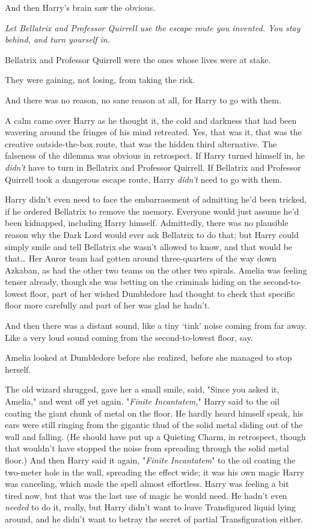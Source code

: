 And then Harry's brain saw the obvious.

\emph{Let Bellatrix and Professor Quirrell use the escape route you invented. 
You stay behind, and turn yourself in.}

Bellatrix and Professor Quirrell were the ones whose lives were at stake.

They were gaining, not losing, from taking the risk.

And there was no reason, no sane reason at all, for Harry to go with them.

A calm came over Harry as he thought it, the cold and darkness that had been 
wavering around the fringes of his mind retreated. Yes, that was it, that was 
the creative outside-the-box route, that was the hidden third alternative. The 
falseness of the dilemma was obvious in retrospect. If Harry turned himself in, 
he \emph{didn't} have to turn in Bellatrix and Professor Quirrell. If Bellatrix 
and Professor Quirrell took a dangerous escape route, Harry \emph{didn't} need 
to go with them.

Harry didn't even need to face the embarrassment of admitting he'd been 
tricked, if he ordered Bellatrix to remove the memory. Everyone would just 
assume he'd been kidnapped, including Harry himself. Admittedly, there was no 
plausible reason why the Dark Lord would ever ask Bellatrix to do that; but 
Harry could simply smile and tell Bellatrix she wasn't allowed to know, and 
that would be that{\ldots}
\sbreak
Her Auror team had gotten around three-quarters of the way down Azkaban, as had 
the other two teams on the other two spirals. Amelia was feeling tenser 
already, though she was betting on the criminals hiding on the second-to-lowest 
floor, part of her wished Dumbledore had thought to check that specific floor 
more carefully and part of her was glad he hadn't.

And then there was a distant sound, like a tiny `tink' noise coming from far 
away. Like a very loud sound coming from the second-to-lowest floor, say.

Amelia looked at Dumbledore before she realized, before she managed to stop 
herself.

The old wizard shrugged, gave her a small smile, said, "Since you asked it, 
Amelia," and went off yet again.
\sbreak
"\emph{Finite Incantatem,}" Harry said to the oil coating the giant chunk of 
metal on the floor. He hardly heard himself speak, his ears were still ringing 
from the gigantic thud of the solid metal sliding out of the wall and falling. 
(He should have put up a Quieting Charm, in retrospect, though that wouldn't 
have stopped the noise from spreading through the solid metal floor.) And then 
Harry said it again, "\emph{Finite Incantatem}" to the oil coating the 
two-meter hole in the wall, spreading the effect wide; it was his own magic 
Harry was canceling, which made the spell almost effortless. Harry was feeling 
a bit tired now, but that was the last use of magic he would need. He hadn't 
even \emph{needed} to do it, really, but Harry didn't want to leave 
Transfigured liquid lying around, and he didn't want to betray the secret of 
partial Transfiguration either.

